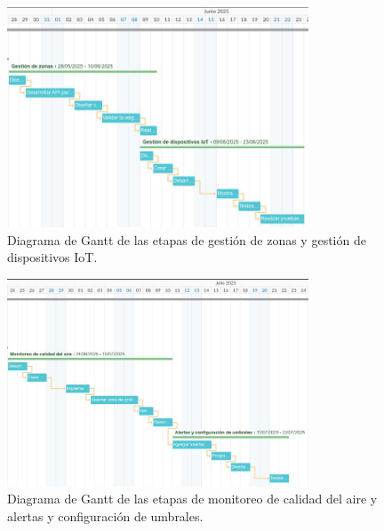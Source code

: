 \documentclass[
11pt, %
]{charter}
\begin{document}
\begin{figure}[htpb]
\centering 
\includegraphics[width=0.8\textwidth]{./Figuras/fig_6-1-Gantt.jpeg}
\caption{Diagrama de Gantt de las etapas de gestión de zonas y gestión de dispositivos IoT.}
\label{fig:AoN}
\end{figure}


\begin{figure}[htpb]
\centering 
\includegraphics[width=0.8\textwidth]{./Figuras/fig_7-1-Gantt.jpeg}
\caption{Diagrama de Gantt de las etapas de monitoreo de calidad del aire y alertas y configuración de umbrales.}
\label{fig:AoN}
\end{figure}
\end{document}
